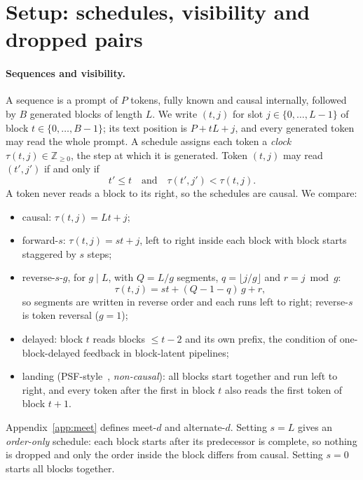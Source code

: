 \documentclass[11pt]{article}
\theoremstyle{definition}
\theoremstyle{remark}
\newcommand{\sch}[1]{\textsf{#1}}
\begin{document}
\section{Setup: schedules, visibility and dropped pairs}
\label{sec:setup}

\paragraph{Sequences and visibility.}
A sequence is a prompt of $P$ tokens, fully known and causal internally, followed by $B$ generated blocks of length $L$.
We write $(t,j)$ for slot $j\in\{0,\dots,L-1\}$ of block $t\in\{0,\dots,B-1\}$; its text position is $P+tL+j$, and every generated token may read the whole prompt.
A schedule assigns each token a \emph{clock} $\tau(t,j)\in\mathbb{Z}_{\ge 0}$, the step at which it is generated.
Token $(t,j)$ may read $(t',j')$ if and only if
\begin{equation}
  t'\le t \quad\text{and}\quad \tau(t',j')<\tau(t,j).
  \label{eq:visibility}
\end{equation}
A token never reads a block to its right, so the schedules are causal.
We compare:
\begin{itemize}
  \item \sch{causal}: $\tau(t,j)=Lt+j$;
  \item \sch{forward-$s$}: $\tau(t,j)=st+j$, left to right inside each block with block starts staggered by $s$ steps;
  \item \sch{reverse-$s$-$g$}, for $g\mid L$, with $Q=L/g$ segments, $q=\lfloor j/g\rfloor$ and $r=j\bmod g$:
  \begin{equation}
    \tau(t,j)=st+(Q-1-q)\,g+r ,
    \label{eq:clock}
  \end{equation}
  so segments are written in reverse order and each runs left to right; \sch{reverse-$s$} is token reversal ($g=1$);
  \item \sch{delayed}: block $t$ reads blocks $\le t-2$ and its own prefix, the condition of one-block-delayed feedback in block-latent pipelines;
  \item \sch{landing} (PSF-style~\citep{he2026psf}, \emph{non-causal}): all blocks start together and run left to right, and every token after the first in block $t$ also reads the first token of block $t+1$.
\end{itemize}
Appendix~\ref{app:meet} defines \sch{meet-$d$} and \sch{alternate-$d$}.
Setting $s=L$ gives an \emph{order-only} schedule: each block starts after its predecessor is complete, so nothing is dropped and only the order inside the block differs from \sch{causal}.
Setting $s=0$ starts all blocks together.
\end{document}

